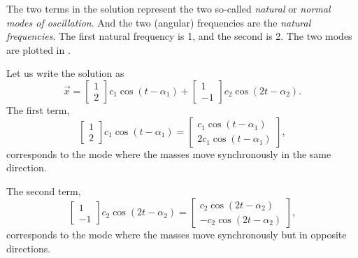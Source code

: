 \begin{example}
The two terms in the solution represent the two
so-called \emph{natural}
or \emph{normal modes of oscillation}.
And the two (angular) frequencies are the
\emph{natural frequencies}.
The first natural frequency is 1, and the second is 2.
The two modes are plotted in .

\begin{myfig}
\capstart
\caption{The two modes of the mass-spring system.  In the left plot
the masses are moving in unison and in the right plot the masses are moving in
opposite directions.\label{sosa:modesfig}}
\end{myfig}

Let us write the solution as
\begin{equation*}
\vec{x} = 
\begin{bmatrix} 1 \\ 2 \end{bmatrix}
c_1 \cos (t - \alpha_1 )
+
\begin{bmatrix} 1 \\ -1 \end{bmatrix}
c_2 \cos (2t - \alpha_2 ) .
\end{equation*}
The first term,
\begin{equation*}
\begin{bmatrix} 1 \\ 2 \end{bmatrix}
c_1 \cos (t - \alpha_1 )
=
\begin{bmatrix}
c_1 \cos (t - \alpha_1 ) \\
2c_1 \cos (t - \alpha_1 )
\end{bmatrix} ,
\end{equation*}
corresponds to the mode where the masses move synchronously
in the same direction.

The second term,
\begin{equation*}
\begin{bmatrix} 1 \\ -1 \end{bmatrix}
c_2 \cos (2t - \alpha_2 )
=
\begin{bmatrix}
c_2 \cos (2t - \alpha_2 ) \\
- c_2 \cos (2t - \alpha_2 )
\end{bmatrix} ,
\end{equation*}
corresponds to the mode where the masses move synchronously
but in opposite directions.


\end{example}
